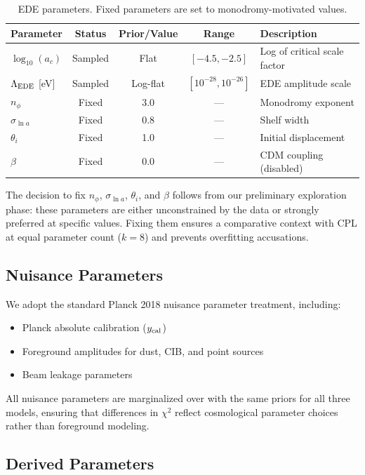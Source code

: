 \documentclass[a4paper,11pt]{article}
\begin{document}
\begin{table}[h]
\centering
\caption{EDE parameters. Fixed parameters are set to monodromy-motivated values.}
\label{tab:ede_priors}
\begin{tabular}{lcccl}
\toprule
Parameter & Status & Prior/Value & Range & Description \\
\midrule
$\log_{10}(a_c)$ & Sampled & Flat & $[-4.5, -2.5]$ & Log of critical scale factor \\
$\Lambda_{\rm EDE}$ [eV] & Sampled & Log-flat & $[10^{-28}, 10^{-26}]$ & EDE amplitude scale \\
\midrule
$n_\phi$ & Fixed & 3.0 & --- & Monodromy exponent \\
$\sigma_{\ln a}$ & Fixed & 0.8 & --- & Shelf width \\
$\theta_i$ & Fixed & 1.0 & --- & Initial displacement \\
$\beta$ & Fixed & 0.0 & --- & CDM coupling (disabled) \\
\bottomrule
\end{tabular}
\end{table}

The decision to fix $n_\phi$, $\sigma_{\ln a}$, $\theta_i$, and $\beta$ follows from our preliminary exploration phase: these parameters are either unconstrained by the data or strongly preferred at specific values. Fixing them ensures a comparative context with CPL at equal parameter count ($k=8$) and prevents overfitting accusations.

\subsection{Nuisance Parameters}

We adopt the standard Planck 2018 nuisance parameter treatment, including:
\begin{itemize}
    \item Planck absolute calibration ($y_{\rm cal}$)
    \item Foreground amplitudes for dust, CIB, and point sources
    \item Beam leakage parameters
\end{itemize}

All nuisance parameters are marginalized over with the same priors for all three models, ensuring that differences in $\chi^2$ reflect cosmological parameter choices rather than foreground modeling.

\subsection{Derived Parameters}
\end{document}

